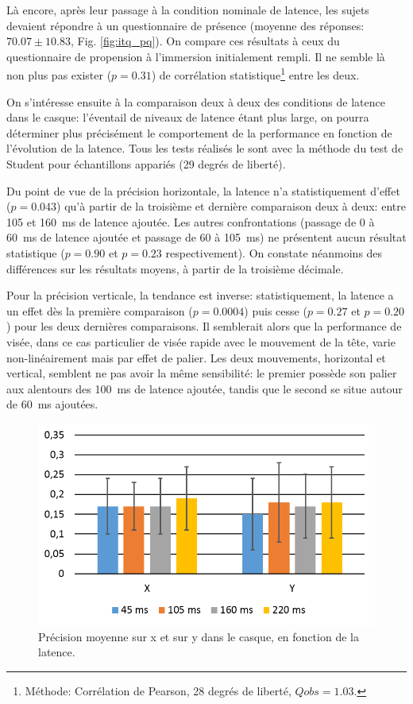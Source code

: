 	\par Là encore, après leur passage à la condition nominale de latence, les sujets devaient répondre à un questionnaire de présence (moyenne des réponses: $70.07 \pm 10.83$, Fig. \ref{fig:itq_pq}). On compare ces résultats à ceux du questionnaire de propension à l'immersion initialement rempli. Il ne semble là non plus pas exister ($p = 0.31$) de corrélation statistique\footnote{Méthode: Corrélation de Pearson, 28 degrés de liberté, $Qobs = 1.03$.} entre les deux.
	
	\par On s'intéresse ensuite à la comparaison deux à deux des conditions de latence dans le casque: l'éventail de niveaux de latence étant plus large, on pourra déterminer plus précisément le comportement de la performance en fonction de l'évolution de la latence. Tous les tests réalisés le sont avec la méthode du test de Student pour échantillons appariés (29 degrés de liberté).
	
	\par Du point de vue de la précision horizontale, la latence n'a statistiquement d'effet ($p = 0.043$) qu'à partir de la troisième et dernière comparaison deux à deux: entre 105 et 160~ms de latence ajoutée. Les autres confrontations (passage de 0 à 60~ms de latence ajoutée et passage de 60 à 105~ms) ne présentent aucun résultat statistique ($p = 0.90$ et $p = 0.23$ respectivement). On constate néanmoins des différences sur les résultats moyens, à partir de la troisième décimale.
	
	\par Pour la précision verticale, la tendance est inverse: statistiquement, la latence a un effet dès la première comparaison ($p = 0.0004$) puis cesse ($p = 0.27$ et $p = 0.20$) pour les deux dernières comparaisons. Il semblerait alors que la performance de visée, dans ce cas particulier de visée rapide avec le mouvement de la tête, varie non-linéairement mais par effet de palier. Les deux mouvements, horizontal et vertical, semblent ne pas avoir la même sensibilité: le premier possède son palier aux alentours des 100~ms de latence ajoutée, tandis que le second se situe autour de 60~ms ajoutées.
	
	\begin{figure}
		\centering
		\includegraphics[width=0.8\linewidth]{Figures/CasquePrecisionResults.png}
		\caption{Précision moyenne sur x et sur y dans le casque, en fonction de la latence.}
		\label{fig:casque_precision}
	\end{figure}
	
